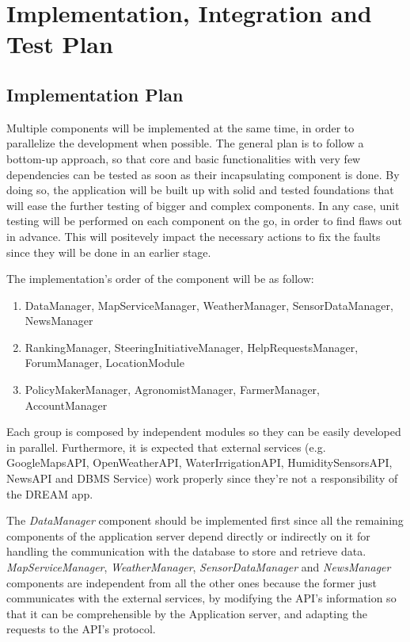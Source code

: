 \documentclass[table, 12pt]{article}
\begin{document}
\section{Implementation, Integration and Test Plan}
\subsection{Implementation Plan}
Multiple components will be implemented at the same time, in order to parallelize the development when possible. The general plan is to follow a bottom-up approach, so that core and basic functionalities with very few dependencies can be tested as soon as their incapsulating component is done. By doing so, the application will be built up with solid and tested foundations that will ease the further testing of bigger and complex components. In any case, unit testing will be performed on each component on the go, in order to find flaws out in advance. This will positevely impact the necessary actions to fix the faults since they will be done in an earlier stage.

The implementation's order of the component will be as follow:
\begin{enumerate}
    \item DataManager, MapServiceManager, WeatherManager, SensorDataManager, NewsManager
    \item RankingManager, SteeringInitiativeManager, HelpRequestsManager, ForumManager, LocationModule
    \item PolicyMakerManager, AgronomistManager, FarmerManager, AccountManager
\end{enumerate}
Each group is composed by independent modules so they can be easily developed in parallel.
Furthermore, it is expected that external services (e.g. GoogleMapsAPI, OpenWeatherAPI, WaterIrrigationAPI, HumiditySensorsAPI, NewsAPI and DBMS Service) work properly since they're not a responsibility of the DREAM app.

The \emph{DataManager} component should be implemented first since all the remaining components of the application server depend directly or indirectly on it for handling the communication with the database to store and retrieve data. \emph{MapServiceManager}, \emph{WeatherManager}, \emph{SensorDataManager} and \emph{NewsManager} components are independent from all the other ones because the former just communicates with the external services, by modifying the API's information so that it can be comprehensible by the Application server, and adapting the requests to the API's protocol.
\end{document}
